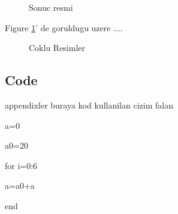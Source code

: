 \documentclass[12pt,english]{article}
\begin{document}
\begin{figure}[H]
\caption{Sonuc resmi\label{fig:Sonuc-resmi}}


\end{figure}


Figure \ref{fig:Sonuc-resmi}' de goruldugu uzere ....

\begin{figure}[H]
\noindent \begin{centering}
\par\end{centering}

\noindent \begin{centering}
\par\end{centering}

\caption{Coklu Resimler\label{fig:Coklu-Resimler}}


\end{figure}


\begin{onehalfspace}
\pagebreak





\pagebreak
\end{onehalfspace}

\appendix
\begin{onehalfspace}

\section{Code}
\end{onehalfspace}

appendixler buraya kod kullanilan cizim falan

a=0

a0=20

for i=0:6

a=a0+a

end
\end{document}
